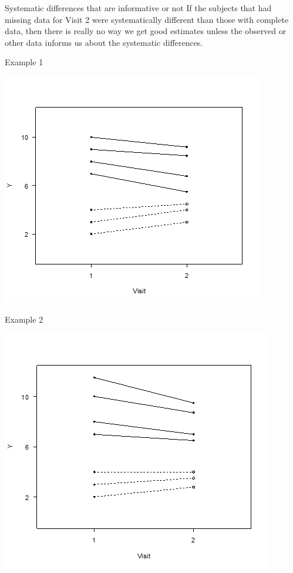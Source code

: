 \documentclass[
  9pt,
  ignorenonframetext,
]{beamer}
\begin{document}
\begin{frame}{Systematic differences that are informative or not}
\protect\hypertarget{systematic-differences-that-are-informative-or-not}{}
If the subjects that had missing data for Visit 2 were systematically
different than those with complete data, then there is really no way we
get good estimates unless the observed or other data informs us about
the systematic differences.

\begin{block}{Example 1}
\protect\hypertarget{example-1}{}
\begin{center}\includegraphics[width=0.7\linewidth]{figs_L20/f4} \end{center}
\end{block}

\begin{block}{Example 2}
\protect\hypertarget{example-2}{}
\begin{center}\includegraphics[width=0.7\linewidth]{figs_L20/f5} \end{center}
\end{block}
\end{frame}
\end{document}
